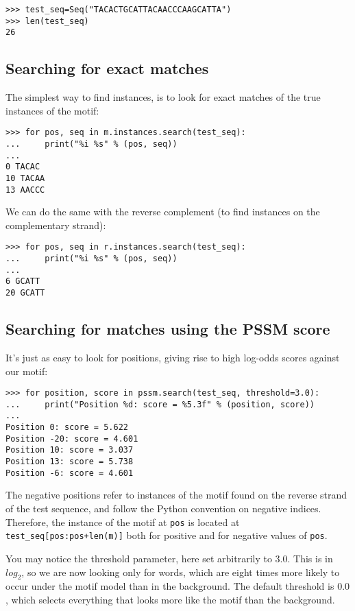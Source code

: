 \begin{verbatim}
>>> test_seq=Seq("TACACTGCATTACAACCCAAGCATTA")
>>> len(test_seq)
26
\end{verbatim}

\subsection{Searching for exact matches}

The simplest way to find instances, is to look for exact matches of
the true instances of the motif:

\begin{verbatim}
>>> for pos, seq in m.instances.search(test_seq):
...     print("%i %s" % (pos, seq))
...
0 TACAC
10 TACAA
13 AACCC
\end{verbatim}
We can do the same with the reverse complement (to find instances on the complementary strand):

\begin{verbatim}
>>> for pos, seq in r.instances.search(test_seq):
...     print("%i %s" % (pos, seq))
...
6 GCATT
20 GCATT
\end{verbatim}

\subsection{Searching for matches using the PSSM score}

It's just as easy to look for positions, giving rise to high log-odds scores against our motif:

\begin{verbatim}
>>> for position, score in pssm.search(test_seq, threshold=3.0):
...     print("Position %d: score = %5.3f" % (position, score))
...
Position 0: score = 5.622
Position -20: score = 4.601
Position 10: score = 3.037
Position 13: score = 5.738
Position -6: score = 4.601
\end{verbatim}
The negative positions refer to instances of the motif found on the
reverse strand of the test sequence, and follow the Python convention
on negative indices. Therefore, the instance of the motif at \verb|pos|
is located at \verb|test_seq[pos:pos+len(m)]| both for positive and for
negative values of \verb|pos|.

You may notice the threshold parameter, here set arbitrarily to
$3.0$. This is in $log_2$, so we are now looking only for words, which
are eight times more likely to occur under the motif model than in the
background. The default threshold is $0.0$, which selects everything
that looks more like the motif than the background.

